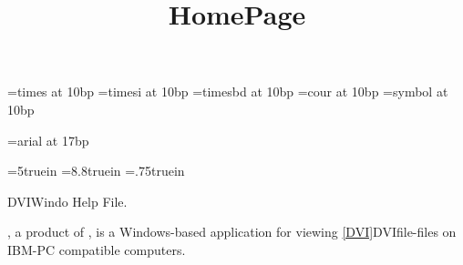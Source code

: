 

\font\times=times at 10bp
\font\timesi=timesi at 10bp
\font\timesbd=timesbd at 10bp
\font\cour=cour at 10bp
\font\sy=symbol at 10bp

\def\rm{\times}
\def\it{\timesi}
\def\bf{\timesbd}
\def\tt{\cour}

\rm

\def\AmSTeX{{\it AMS}-\TeX} %

\let\sl=\it	%

\font\Chapterfont=arial at 17bp




\def\minus{{\sy\char45}}
\def\asterisk{\char42}
\def\plus{\char43}
\def\bullit{\char149}
\def\ellipses{\char133}
\def\copyrght{\char169} 

\hsize=5truein \vsize=8.8truein \hoffset=.75truein

\title{HomePage}DVIWindo Help File.

, a product of , is a Windows-based
application for viewing \ref{DVI}{DVIfile}-files on IBM-PC compatible
computers.
   \bigskip


\medskip

